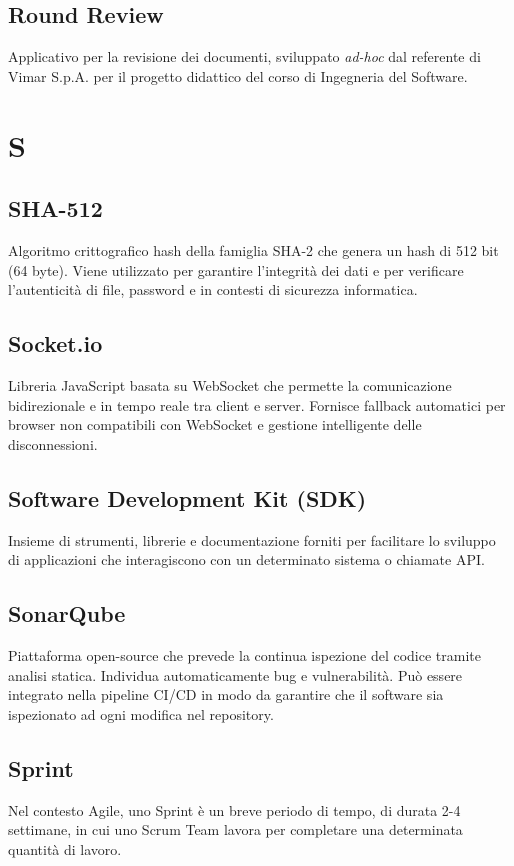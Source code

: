\documentclass[10pt, letterpaper]{article}
\begin{document}
\subsection*{Round Review}
Applicativo per la revisione dei documenti, sviluppato \textit{ad-hoc} dal referente di Vimar S.p.A. per il progetto didattico del corso di Ingegneria del Software.

\section{S}

\subsection*{SHA-512}
Algoritmo crittografico hash della famiglia SHA-2 che genera un hash di 512 bit (64 byte). Viene utilizzato per garantire l'integrità dei dati e per verificare l'autenticità di file, password e in contesti di sicurezza informatica.

\subsection*{Socket.io}
Libreria JavaScript basata su WebSocket che permette la comunicazione bidirezionale e in tempo reale tra client e server. Fornisce fallback automatici per browser non compatibili con WebSocket e gestione intelligente delle disconnessioni.

\subsection*{Software Development Kit (SDK)}
Insieme di strumenti, librerie e documentazione forniti per facilitare lo sviluppo di applicazioni che interagiscono con un determinato sistema o chiamate API.

\subsection*{SonarQube}
Piattaforma open-source che prevede la continua ispezione del codice tramite analisi statica. Individua automaticamente bug e vulnerabilità. Può essere integrato nella pipeline CI/CD in modo da garantire che il software sia ispezionato ad ogni modifica nel repository.

\subsection*{Sprint}
Nel contesto Agile, uno Sprint è un breve periodo di tempo, di durata 2-4 settimane, in cui uno Scrum Team lavora per completare una determinata quantità di
lavoro.
\end{document}
